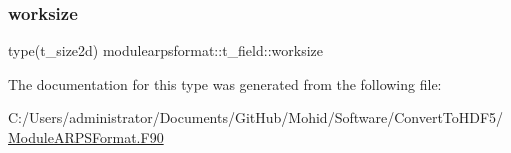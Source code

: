 \mbox{\label{structmodulearpsformat_1_1t__field_a98427b2b2e2d0ab805d148325add0f34}} 
\subsubsection{\texorpdfstring{worksize}{worksize}}
{\footnotesize\ttfamily type(t\+\_\+size2d) modulearpsformat\+::t\+\_\+field\+::worksize\hspace{0.3cm}{\ttfamily [private]}}



The documentation for this type was generated from the following file\+:\begin{DoxyCompactItemize}
\item 
C\+:/\+Users/administrator/\+Documents/\+Git\+Hub/\+Mohid/\+Software/\+Convert\+To\+H\+D\+F5/\mbox{\hyperlink{_module_a_r_p_s_format_8_f90}{Module\+A\+R\+P\+S\+Format.\+F90}}\end{DoxyCompactItemize}
